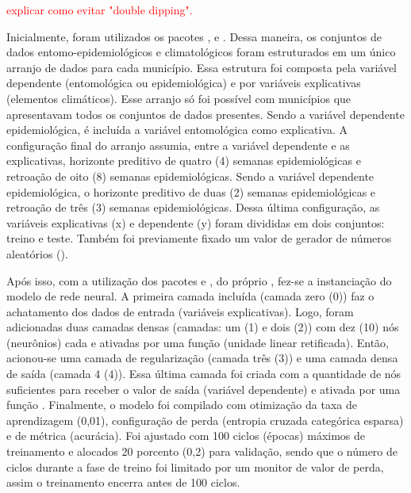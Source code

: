 \documentclass[
	12pt,				%
	openright,			%
	oneside,			%
	a4paper,			%
	english,			%
	french,				%
	spanish,			%
	brazil				%
	dvipsnames, table]{abntex2}
\begin{document}
\indent \textcolor{red}{explicar como evitar "double dipping".}



\indent Inicialmente, foram utilizados os pacotes ,  e  \cite{scikit-learn_2011_pedregosa, sklearn_2013_buitinck}. Dessa maneira, os conjuntos de dados entomo-epidemiológicos e climatológicos foram estruturados em um único arranjo de dados para cada município. Essa estrutura foi composta pela variável dependente (entomológica ou epidemiológica) e por variáveis explicativas (elementos climáticos). Esse arranjo só foi possível com municípios que apresentavam todos os conjuntos de dados presentes. Sendo a variável dependente epidemiológica, é incluída a variável entomológica como explicativa. A configuração final do arranjo assumia, entre a variável dependente e as explicativas, horizonte preditivo de quatro (4) semanas epidemiológicas e retroação de oito (8) semanas epidemiológicas. Sendo a variável dependente epidemiológica, o horizonte preditivo de duas (2) semanas epidemiológicas e retroação de três (3) semanas epidemiológicas. Dessa última configuração, as variáveis explicativas (x) e dependente (y) foram divididas em dois conjuntos: treino e teste. Também foi previamente fixado um valor de gerador de números aleatórios ().

\indent Após isso, com a utilização dos pacotes  \cite{tensorflow_2015_whitepaper} e  \cite{keras_2015_chollet}, do próprio , fez-se a instanciação do modelo de rede neural. A primeira camada incluída (camada zero (0)) faz o achatamento dos dados de entrada (variáveis explicativas). Logo, foram adicionadas duas camadas densas (camadas: um (1) e dois (2)) com dez (10) nós (neurônios) cada e ativadas por uma função  (unidade linear retificada). Então, acionou-se uma camada de regularização (camada três (3)) e uma camada densa de saída (camada 4 (4)). Essa última camada foi criada com a quantidade de nós suficientes para receber o valor de saída (variável dependente) e ativada por uma função . Finalmente, o modelo foi compilado com otimização da taxa de aprendizagem (0,01), configuração de perda (entropia cruzada categórica esparsa) e de métrica (acurácia). Foi ajustado com 100 ciclos (épocas) máximos de treinamento e alocados 20 porcento (0,2) para validação, sendo que o número de ciclos durante a fase de treino foi limitado por um monitor de valor de perda, assim o treinamento encerra antes de 100 ciclos.
\end{document}
